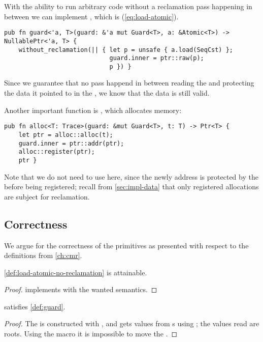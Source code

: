 With the ability to run arbitrary code without a reclamation pass happening in between we can
implement , which is  (\cref{eq:load-atomic}).
\begin{lstlisting}[style=Rust]
pub fn guard<'a, T>(guard: &'a mut Guard<T>, a: &Atomic<T>) -> NullablePtr<'a, T> {
    without_reclamation(|| { let p = unsafe { a.load(SeqCst) };
                             guard.inner = ptr::raw(p);
                             p }) }
\end{lstlisting}
Since we guarantee that no pass happend in between reading the  and protecting the
data it pointed to in the , we know that the data is still valid.


Another important function is , which allocates memory:
\begin{lstlisting}[style=Rust]
pub fn alloc<T: Trace>(guard: &mut Guard<T>, t: T) -> Ptr<T> {
    let ptr = alloc::alloc(t);
    guard.inner = ptr::addr(ptr);
    alloc::register(ptr);
    ptr }
\end{lstlisting}
Note that we do not need to use  here, since the newly address is
protected by the  before being registered; recall from \cref{sec:impl-data} that only
registered allocations are subject for reclamation.




\subsection{Correctness}

We argue for the correctness of the primitives as presented with respect to the definitions from
\cref{ch:cmr}.


\begin{claim}
  \cref{def:load-atomic-no-reclamation} is attainable.
\end{claim}
\begin{proof}
   implements  with the wanted semantics.
\end{proof}

\begin{claim}
   satisfies \cref{def:guard}.
\end{claim}
\begin{proof}
  The  is constructed with , and gets values from s using
  ; the values read are roots.
  Using the  macro it is impossible to move the .
\end{proof}

